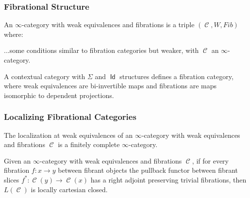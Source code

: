 \documentclass{beamer}
\DeclareMathOperator{\Id}{\mathsf{Id}}
\DeclareMathOperator{\cC}{\mathcal{C}}
\begin{document}
\begin{frame}
  \frametitle{Fibrational Structure}
  
  \begin{defn}
    An $\infty$-category with weak equivalences and fibrations is a triple
    $(\cC,W,Fib)$ where:

    ...some conditions similar to fibration categories but weaker, with
    $\cC$ an $\infty$-category.
  \end{defn}

  \begin{thm}
    A contextual category with $\Sigma$ and $\Id$ structures defines a
    fibration category, where weak
    equivalences are bi-invertible maps and
    fibrations are maps isomorphic to  dependent projections.
  \end{thm}
\end{frame}

\begin{frame}
  \frametitle{Localizing Fibrational Categories}

  \begin{prop}[Cisinski]
    The localization at weak equivalences of an $\infty$-category with weak
    equivalences and fibrations $\cC$ is a finitely complete $\infty$-category.
  \end{prop}

  \begin{prop}[Cisinski]
    Given an $\infty$-category with weak equivalences and fibrations $\cC$, if
    for every fibration $f\colon x\rightarrow y$ between fibrant objects the
    pullback functor between fibrant slices $f^*\colon\cC(y)\rightarrow\cC(x)$
    has a right adjoint preserving trivial fibrations, then $L(\cC)$ is locally
    cartesian closed.
  \end{prop}
\end{frame}
\end{document}
